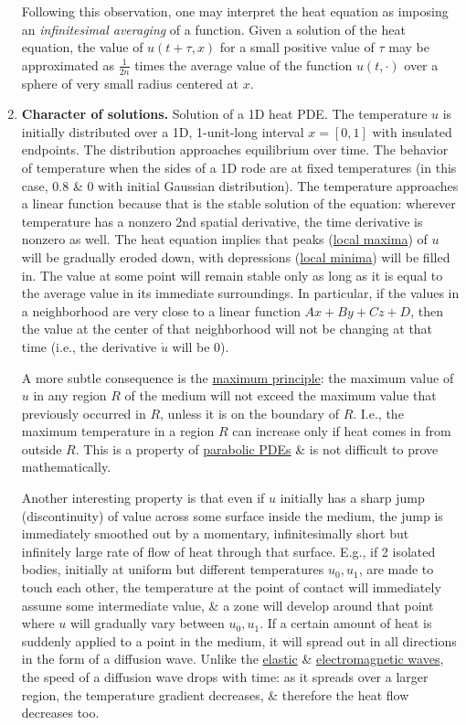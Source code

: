 \documentclass{article}
\begin{document}
\begin{enumerate}
	Following this observation, one may interpret the heat equation as imposing an {\it infinitesimal averaging} of a function. Given a solution of the heat equation, the value of $u(t + \tau,x)$ for a small positive value of $\tau$ may be approximated as $\frac{1}{2n}$ times the average value of the function $u(t,\cdot)$ over a sphere of very small radius centered at $x$.
	\item {\bf Character of solutions.} {\sf Solution of a 1D heat PDE. The temperature $u$ is initially distributed over a 1D, 1-unit-long interval $x = [0,1]$ with insulated endpoints. The distribution approaches equilibrium over time. The behavior of temperature when the sides of a 1D rode are at fixed temperatures (in this case, $0.8$ \& 0 with initial Gaussian distribution). The temperature approaches a linear function because that is the stable solution of the equation: wherever temperature has a nonzero 2nd spatial derivative, the time derivative is nonzero as well.} The heat equation implies that peaks (\href{https://en.wikipedia.org/wiki/Local_maximum}{local maxima}) of $u$ will be gradually eroded down, with depressions (\href{https://en.wikipedia.org/wiki/Local_minimum}{local minima}) will be filled in. The value at some point will remain stable only as long as it is equal to the average value in its immediate surroundings. In particular, if the values in a neighborhood are very close to a linear function $Ax + By + Cz + D$, then the value at the center of that neighborhood will not be changing at that time (i.e., the derivative $\dot{u}$ will be 0).
	
	A more subtle consequence is the \href{https://en.wikipedia.org/wiki/Maximum_principle}{maximum principle}: the maximum value of $u$ in any region $R$ of the medium will not exceed the maximum value that previously occurred in $R$, unless it is on the boundary of $R$. I.e., the maximum temperature in a region $R$ can increase only if heat comes in from outside $R$. This is a property of \href{https://en.wikipedia.org/wiki/Parabolic_partial_differential_equation}{parabolic PDEs} \& is not difficult to prove mathematically.
	
	Another interesting property is that even if $u$ initially has a sharp jump (discontinuity) of value across some surface inside the medium, the jump is immediately smoothed out by a momentary, infinitesimally short but infinitely large rate of flow of heat through that surface. E.g., if 2 isolated bodies, initially at uniform but different temperatures $u_0,u_1$, are made to touch each other, the temperature at the point of contact will immediately assume some intermediate value, \& a zone will develop around that point where $u$ will gradually vary between $u_0,u_1$. If a certain amount of heat is suddenly applied to a point in the medium, it will spread out in all directions in the form of a diffusion wave. Unlike the \href{https://en.wikipedia.org/wiki/Mechanical_wave}{elastic} \& \href{https://en.wikipedia.org/wiki/Electromagnetic_wave}{electromagnetic waves}, the speed of a diffusion wave drops with time: as it spreads over a larger region, the temperature gradient decreases, \& therefore the heat flow decreases too.
\end{enumerate}
\end{document}
